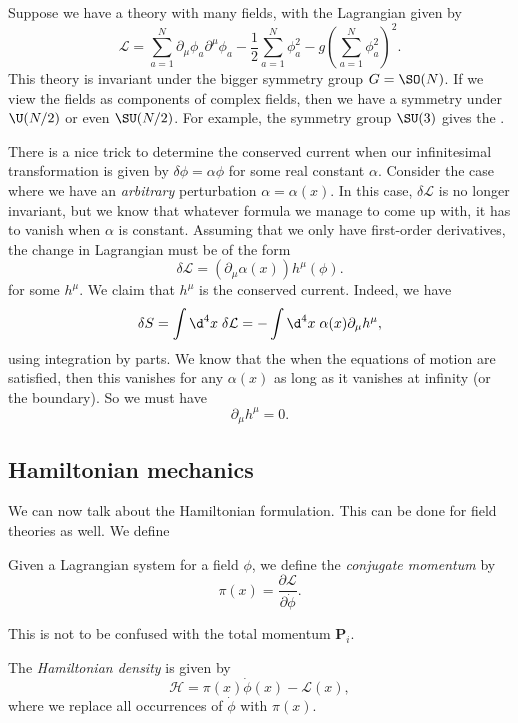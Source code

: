 \documentclass[a4paper]{article}
\begin{document}
\begin{eg}
  Suppose we have a theory with many fields, with the Lagrangian given by
  \[
    \mathcal{L} = \sum_{a = 1}^N \partial_\mu \phi_a \partial^\mu \phi_a - \frac{1}{2} \sum_{a = 1}^N \phi_a^2 - g \left(\sum_{a = 1}^N \phi_a^2\right)^2.
  \]
  This theory is invariant under the bigger symmetry group $G = \SO(N)$. If we view the fields as components of complex fields, then we have a symmetry under $\U(N/2)$ or even $\SU(N/2)$. For example, the symmetry group $\SU(3)$ gives the .
\end{eg}

\begin{eg}
  There is a nice trick to determine the conserved current when our infinitesimal transformation is given by $\delta \phi = \alpha \phi$ for some real constant $\alpha$. Consider the case where we have an \emph{arbitrary} perturbation $\alpha = \alpha(x)$. In this case, $\delta\mathcal{L}$ is no longer invariant, but we know that whatever formula we manage to come up with, it has to vanish when $\alpha$ is constant. Assuming that we only have first-order derivatives, the change in Lagrangian must be of the form
  \[
    \delta \mathcal{L} = (\partial_\mu \alpha(x)) h^\mu(\phi).
  \]
  for some $h^\mu$. We claim that $h^\mu$ is the conserved current. Indeed, we have
  \[
    \delta S = \int \d^4 x\; \delta \mathcal{L} = - \int \d^4 x\; \alpha(x) \partial_\mu h^\mu,
  \]
  using integration by parts. We know that the when the equations of motion are satisfied, then this vanishes for any $\alpha(x)$ as long as it vanishes at infinity (or the boundary). So we must have
  \[
    \partial_\mu h^\mu = 0.
  \]
\end{eg}

\subsection{Hamiltonian mechanics}
We can now talk about the Hamiltonian formulation. This can be done for field theories as well. We define
\begin{defi}
  Given a Lagrangian system for a field $\phi$, we define the \emph{conjugate momentum} by
  \[
    \pi(x) = \frac{\partial \mathcal{L}}{\partial \dot{\phi}}.
  \]
\end{defi}
This is not to be confused with the total momentum $\mathbf{P}_i$.

\begin{defi}
  The \emph{Hamiltonian density} is given by
  \[
    \mathcal{H} = \pi(x) \dot{\phi}(x) - \mathcal{L}(x),
  \]
  where we replace all occurrences of $\dot{\phi}$ with $\pi(x)$.
\end{defi}
\end{document}

